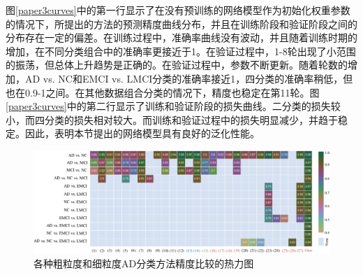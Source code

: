 图\ref{paper3curves}中的第一行显示了在没有预训练的网络模型作为初始化权重参数的情况下，所提出的方法的预测精度曲线分布，并且在训练阶段和验证阶段之间的分布存在一定的偏差。在训练过程中，准确率曲线没有波动，并且随着训练时期的增加，在不同分类组合中的准确率更接近于1。在验证过程中，1-8轮出现了小范围的振荡，但总体上升趋势是正确的。在验证过程中，参数不断更新。随着轮数的增加，AD vs. NC和EMCI vs. LMCI分类的准确率接近1，四分类的准确率稍低，但也在0.9-1之间。在其他数据组合分类的情况下，精度也稳定在第11轮。图\ref{paper3curves}中的第二行显示了训练和验证阶段的损失曲线。二分类的损失较小，而四分类的损失相对较大。而训练和验证过程中的损失明显减少，并趋于稳定。因此，表明本节提出的网络模型具有良好的泛化性能。

    \begin{figure}[ht]
      \centering
      \includegraphics[width=0.9\linewidth]{figs/paper3rlt20230306-2.pdf}
      \caption{各种粗粒度和细粒度AD分类方法精度比较的热力图}\label{paper3heatmap}
    \end{figure}
    
